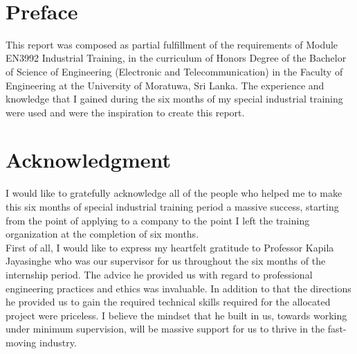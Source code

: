 \documentclass[a4paper,12pt]{report}
\begin{document}
	
\pagecolor{lightpink}

\pagecolor{white} %



\newpage \
\thispagestyle{empty}
\newpage
{} %



\chapter*{Preface}
This report was composed as partial fulfillment of the requirements of Module EN3992 Industrial Training, in the curriculum of Honors Degree of the Bachelor of Science of Engineering (Electronic and Telecommunication) in the Faculty of Engineering at the University of Moratuwa, Sri Lanka. The experience and knowledge that I gained during the six months of my special industrial training were used and were the inspiration to create this report.\\

 

\cleardoublepage



\chapter*{Acknowledgment}

I would like to gratefully acknowledge all of the people who helped me to make this six months of special industrial training period a massive success, starting from the point of applying to a company to the point I left the training organization at the completion of six months.\\

First of all, I would like to express my heartfelt gratitude to Professor Kapila Jayasinghe who was our supervisor for us throughout the six months of the internship period. The advice he provided us with regard to professional engineering practices and ethics was invaluable. In addition to that the directions he provided us to gain the required technical skills required for the allocated project were priceless. I believe the mindset that he built in us, towards working under minimum supervision, will be massive support for us to thrive in the fast-moving industry.\\
\end{document}
